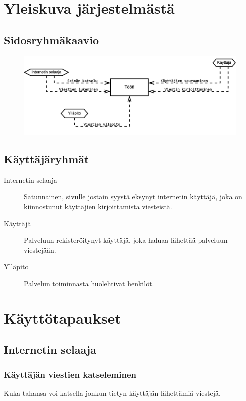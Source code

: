 \documentclass{article}
\let\stdsection\section
\renewcommand\section{\newpage\stdsection}
\begin{document}
\section{Yleiskuva järjestelmästä}

\subsection{Sidosryhmäkaavio}

\begin{figure}[H]
    \centering
    \includegraphics[width=\textwidth]{sidosryhmat.pdf}
\end{figure}

\subsection{Käyttäjäryhmät}

\begin{description}
    \item[Internetin selaaja] Satunnainen, sivulle jostain syystä eksynyt internetin käyttäjä, joka on kiinnostunut käyttäjien kirjoittamista viesteistä.    
    \item[Käyttäjä] Palveluun rekisteröitynyt käyttäjä, joka haluaa lähettää palveluun viestejään.
    \item[Ylläpito] Palvelun toiminnasta huolehtivat henkilöt.
\end{description}

\section{Käyttötapaukset}

\subsection{Internetin selaaja}

\subsubsection{Käyttäjän viestien katseleminen}
Kuka tahansa voi katsella jonkun tietyn käyttäjän lähettämiä viestejä.
\end{document}
